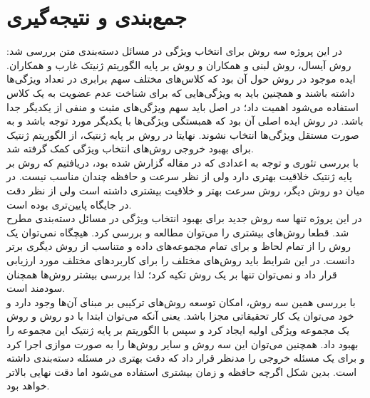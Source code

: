 \chapter{جمع‌بندی و نتیجه‌گیری}
در این پروژه سه روش برای انتخاب ویژگی در مسائل دسته‌بندی متن بررسی شد: روش  آیسال\cite{uysal2016improved}، روش  لبنی و همکاران\cite{labani2018novel} و روش بر پایه الگوریتم ژنیتک غارب و همکاران\cite{ghareb2016hybrid}. ایده موجود در روش  حول آن بود که کلاس‌های مختلف سهم برابری در تعداد ویژگی‌ها داشته باشند و همچنین باید به ویژگی‌‌هایی که برای شناخت عدم عضویت به یک کلاس استفاده می‌شود اهمیت داد؛ در اصل باید سهم ویژگی‌های مثبت و منفی از یکدیگر جدا باشد. در روش  ایده اصلی آن بود که همبستگی ویژگی‌ها با یکدیگر مورد توجه باشد و به صورت مستقل ویژگی‌ها انتخاب نشوند. نهایتا در روش بر پایه ژنتیک، از الگوریتم ژنتیک برای بهبود خروجی روش‌های انتخاب ویژگی کمک گرفته شد.
\\

با بررسی تئوری و توجه به اعدادی که در مقاله گزارش شده بود، دریافتیم که روش بر پایه ژنتیک خلاقیت بهتری دارد ولی از نظر سرعت و حافظه چندان مناسب نیست. در میان دو روش دیگر، روش  سرعت بهتر و خلاقیت بیشتری داشته است ولی از نظر دقت در جایگاه پایین‌تری بوده است.
\\

در این پروژه تنها سه روش جدید برای بهبود انتخاب ویژگی در مسائل دسته‌بندی مطرح شد. قطعا روش‌های بیشتری را می‌توان مطالعه و بررسی کرد. هیچگاه نمی‌توان یک روش را از تمام لحاظ و برای تمام مجموعه‌های داده و متناسب از روش دیگری برتر دانست. در این شرایط باید روش‌های مختلف را برای کاربرد‌های مختلف مورد ارزیابی قرار داد و نمی‌توان تنها بر یک روش تکیه کرد؛ لذا بررسی بیشتر روش‌ها همچنان سودمند است.
\\

با بررسی همین سه روش، امکان توسعه روش‌های ترکیبی بر مبنای آن‌ها وجود دارد و خود می‌توان یک کار تحقیقاتی مجزا باشد. یعنی آنکه می‌توان ابتدا با دو روش  و روش  یک مجموعه ویژگی اولیه ایجاد کرد و سپس با الگوریتم بر پایه ژنتیک این مجموعه را بهبود داد. همچنین می‌توان این سه روش و سایر روش‌ها را به صورت موازی اجرا کرد و برای یک مسئله خروجی را مدنظر قرار داد که دقت بهتری در مسئله دسته‌بندی داشته است. بدین شکل اگرچه حافظه و زمان بیشتری استفاده می‌شود اما دقت نهایی بالاتر خواهد بود. 